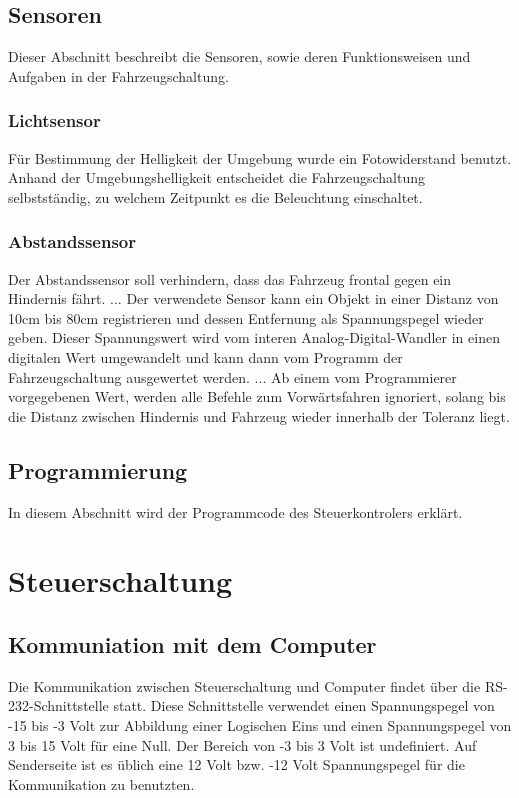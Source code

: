 \documentclass{scrartcl}
\begin{document}
	
	\subsection{Sensoren}
		Dieser Abschnitt beschreibt die Sensoren, sowie deren Funktionsweisen und Aufgaben
		in der Fahrzeugschaltung.
		\subsubsection{Lichtsensor}
			Für Bestimmung der Helligkeit der Umgebung wurde ein Fotowiderstand benutzt.
			Anhand der Umgebungshelligkeit entscheidet die Fahrzeugschaltung selbstständig,
			zu welchem Zeitpunkt es die Beleuchtung einschaltet.
		\subsubsection{Abstandssensor}
			Der Abstandssensor soll verhindern, dass das Fahrzeug frontal gegen ein Hindernis fährt.
			...
			Der verwendete Sensor kann ein Objekt in einer Distanz von 10cm bis 80cm registrieren
			und dessen Entfernung als Spannungspegel wieder geben. Dieser Spannungswert wird vom
			interen Analog-Digital-Wandler in einen digitalen Wert umgewandelt und kann dann vom
			Programm der Fahrzeugschaltung ausgewertet werden.
			...
			Ab einem vom Programmierer vorgegebenen Wert, werden alle Befehle zum Vorwärtsfahren
			ignoriert, solang bis die Distanz zwischen Hindernis und Fahrzeug wieder innerhalb
			der Toleranz liegt.
	
	\subsection{Programmierung} %
		In diesem Abschnitt wird der Programmcode des Steuerkontrolers erklärt.

\newpage

\section{Steuerschaltung}

	\subsection{Kommuniation mit dem Computer} %
		Die Kommunikation zwischen Steuerschaltung und Computer findet über die RS-232-Schnittstelle statt.
		Diese Schnittstelle verwendet einen Spannungspegel von -15 bis -3 Volt zur Abbildung einer Logischen Eins 
		und einen Spannungspegel von 3 bis 15 Volt für eine Null.
		Der Bereich von -3 bis 3 Volt ist undefiniert.
		Auf Senderseite ist es üblich eine 12 Volt bzw. -12 Volt Spannungspegel für die Kommunikation zu benutzten.
\end{document}
